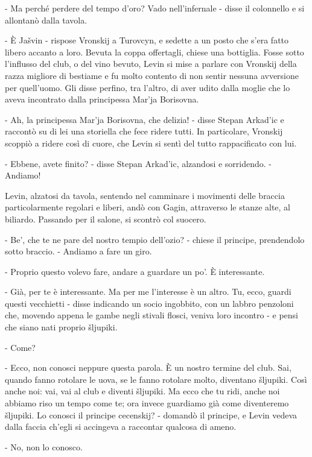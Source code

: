 - Ma perché perdere del tempo d'oro? Vado nell'infernale - disse il colonnello e si allontanò dalla tavola. 

- È Jašvin - rispose Vronskij a Turovcyn, e sedette a un posto che s'era fatto libero accanto a loro. Bevuta la coppa offertagli, chiese una bottiglia. Fosse sotto l'influsso del club, o del vino bevuto, Levin si mise a parlare con Vronskij della razza migliore di bestiame e fu molto contento di non sentir nessuna avversione per quell'uomo. Gli disse perfino, tra l'altro, di aver udito dalla moglie che lo aveva incontrato dalla principessa Mar'ja Borisovna. 

- Ah, la principessa Mar'ja Borisovna, che delizia! - disse Stepan Arkad'ic e raccontò su di lei una storiella che fece ridere tutti. In particolare, Vronskij scoppiò a ridere così di cuore, che Levin si sentì del tutto rappacificato con lui. 

- Ebbene, avete finito? - disse Stepan Arkad'ic, alzandosi e sorridendo. - Andiamo! 

\label{viii-6} 

Levin, alzatosi da tavola, sentendo nel camminare i movimenti delle braccia particolarmente regolari e liberi, andò con Gagin, attraverso le stanze alte, al biliardo. Passando per il salone, si scontrò col suocero. 

- Be', che te ne pare del nostro tempio dell'ozio? - chiese il principe, prendendolo sotto braccio. - Andiamo a fare un giro. 

- Proprio questo volevo fare, andare a guardare un po'. È interessante. 

- Già, per te è interessante. Ma per me l'interesse è un altro. Tu, ecco, guardi questi vecchietti - disse indicando un socio ingobbito, con un labbro penzoloni che, movendo appena le gambe negli stivali flosci, veniva loro incontro - e pensi che siano nati proprio šljupiki. 

- Come? 

- Ecco, non conosci neppure questa parola. È un nostro termine del club. Sai, quando fanno rotolare le uova, se le fanno rotolare molto, diventano šljupiki. Così anche noi: vai, vai al club e diventi šljupiki. Ma ecco che tu ridi, anche noi abbiamo riso un tempo come te; ora invece guardiamo già come diventeremo šljupiki. Lo conosci il principe cecenskij? - domandò il principe, e Levin vedeva dalla faccia ch'egli si accingeva a raccontar qualcosa di ameno. 

- No, non lo conosco. 

